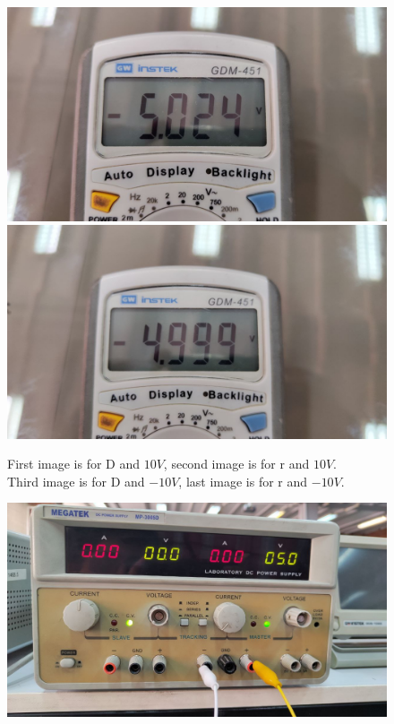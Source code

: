 \documentclass[11pt]{article}
\newcommand{\PicScale}{0.2}
\begin{document}
\begin{question}
\begin{subquestion}
{\begin{figure}[H]
                \includegraphics[scale=0.08,angle=0]{Fig/12.jpeg}
                \includegraphics[scale=0.08,angle=0]{Fig/13.jpeg}
                \caption{First image is for D and $10V$, second image is for r and $10V$. \\
                \hspace*{14mm} Third image is for D and $-10V$, last image is for r and $-10V$.}
            \end{figure}
            \begin{figure}[H]
                \centering
                \includegraphics[scale=\PicScale,angle=0]{Fig/14.jpeg}

\end{figure}}
\end{subquestion}
\end{question}
\end{document}

